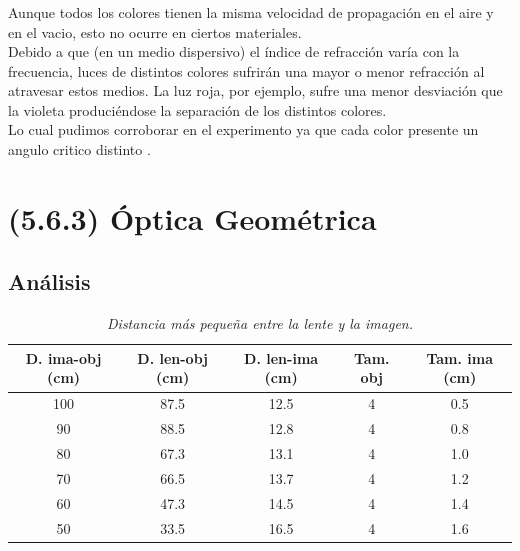\documentclass{article}
\begin{document}
\subsubsection{}
Aunque todos los colores tienen la misma velocidad de propagación en el aire y en el vacio, esto no ocurre en ciertos materiales.
\\
Debido a que (en un medio dispersivo) el índice de refracción varía con la frecuencia, luces de distintos colores sufrirán una mayor o menor refracción al atravesar estos medios. La luz roja, por ejemplo, sufre una menor desviación que la violeta produciéndose la separación de los distintos colores.
\\
Lo cual pudimos corroborar en el experimento ya que cada color presente un angulo critico distinto .



\section{(5.6.3) Óptica Geométrica}
\subsection{Análisis}

\begin{table}[h!]
\begin{center}
\begin{tabular}{ |c|c|c|c|c| } 
 \hline
 D. ima-obj (cm) & D. len-obj (cm)& D. len-ima (cm) & Tam. obj & Tam. ima (cm)\\ 
 \hline
 100 & 87.5	 & 12.5	& 4	&  0.5	\\ 
 90  & 88.5	 & 12.8	& 4	&  0.8	\\ 
 80  & 67.3	 & 13.1	& 4	&  1.0	\\
 70  & 66.5	 & 13.7	& 4	&  1.2	\\
 60  & 47.3	 & 14.5	& 4	&  1.4	\\
 50  & 33.5	 & 16.5	& 4	&  1.6	\\
 \hline
\end{tabular}
\caption{ \emph{Distancia más pequeña entre la lente y la imagen.}}
\label{table:1}
\end{center}
\end{table}
\end{document}

